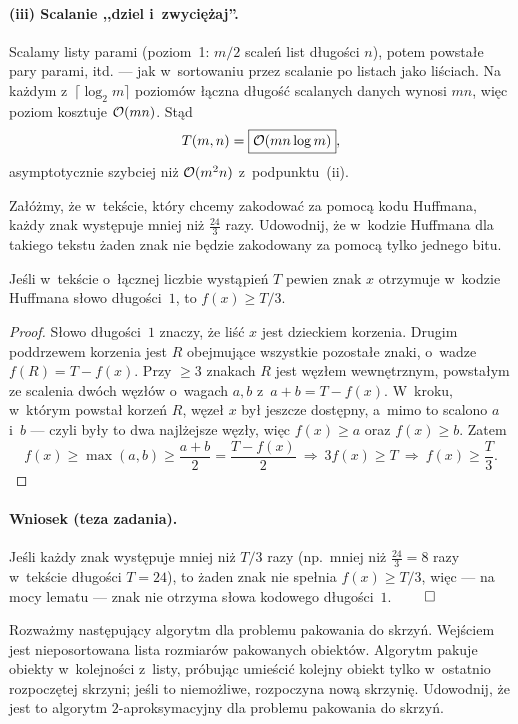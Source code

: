 \paragraph{(iii) Scalanie ,,dziel i~zwyciężaj''.}
Scalamy listy parami (poziom~1: $m/2$ scaleń list długości $n$), potem powstałe
pary parami, itd. --- jak w~sortowaniu przez scalanie po listach jako liściach.
Na każdym z~$\lceil\log_2 m\rceil$ poziomów łączna długość scalanych danych
wynosi $mn$, więc poziom kosztuje $\mathcal{O}(mn)$. Stąd
\[
	T(m,n)=\boxed{\mathcal{O}(mn\log m)},
\]
asymptotycznie szybciej niż $\mathcal{O}(m^2 n)$ z~podpunktu~(ii).

\clearpage
\begin{zadanie}
	Załóżmy, że w~tekście, który chcemy zakodować za pomocą kodu Huffmana, każdy
	znak występuje mniej niż $\frac{24}{3}$ razy. Udowodnij, że w~kodzie Huffmana
	dla takiego tekstu żaden znak nie będzie zakodowany za pomocą tylko jednego
	bitu.
\end{zadanie}

\begin{lemma}
	Jeśli w~tekście o~łącznej liczbie wystąpień $T$ pewien znak $x$ otrzymuje
	w~kodzie Huffmana słowo długości~$1$, to $f(x)\geq T/3$.
\end{lemma}
\begin{proof}
	Słowo długości~$1$ znaczy, że liść $x$ jest dzieckiem korzenia. Drugim
	poddrzewem korzenia jest $R$ obejmujące wszystkie pozostałe znaki, o~wadze
	$f(R)=T-f(x)$. Przy $\geq 3$ znakach $R$ jest węzłem wewnętrznym, powstałym
	ze scalenia dwóch węzłów o~wagach $a,b$ z~$a+b=T-f(x)$. W~kroku, w~którym
	powstał korzeń $R$, węzeł $x$ był jeszcze dostępny, a~mimo to scalono $a$
	i~$b$ --- czyli były to dwa najlżejsze węzły, więc $f(x)\geq a$ oraz
	$f(x)\geq b$. Zatem
	\[
		f(x)\geq\max(a,b)\geq\frac{a+b}{2}=\frac{T-f(x)}{2}
		\ \Longrightarrow\ 3f(x)\geq T\ \Longrightarrow\ f(x)\geq\frac{T}{3}.
	\]
\end{proof}

\paragraph{Wniosek (teza zadania).}
Jeśli każdy znak występuje mniej niż $T/3$ razy (np.\ mniej niż
$\tfrac{24}{3}=8$ razy w~tekście długości $T=24$), to żaden znak nie spełnia
$f(x)\geq T/3$, więc --- na mocy lematu ---  znak nie otrzyma słowa
kodowego długości~$1$. $\qed$

\clearpage
\begin{zadanie}
	Rozważmy następujący algorytm dla problemu pakowania do skrzyń. Wejściem jest
	nieposortowana lista rozmiarów pakowanych obiektów. Algorytm pakuje obiekty
	w~kolejności z~listy, próbując umieścić kolejny obiekt tylko w~ostatnio
	rozpoczętej skrzyni; jeśli to niemożliwe, rozpoczyna nową skrzynię. Udowodnij,
	że jest to algorytm $2$-aproksymacyjny dla problemu pakowania do skrzyń.
\end{zadanie}

